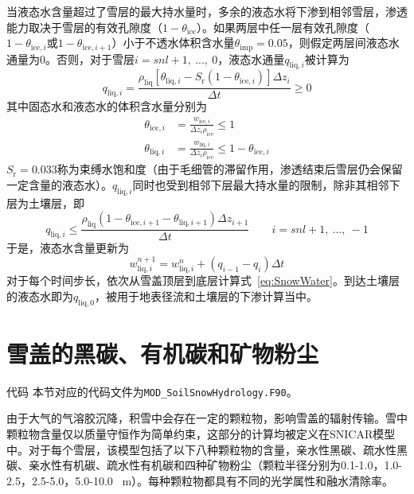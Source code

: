 当液态水含量超过了雪层的最大持水量时，多余的液态水将下渗到相邻雪层，渗透能力取决于雪层的有效孔隙度（$1-\theta_{\mathrm{ice}}$）。如果两层中任一层有效孔隙度（$1-\theta_{\mathrm{ice},i}$或$1-\theta_{\mathrm{ice},i+1}$）小于不透水体积含水量$\theta_{\mathrm{imp}}=0.05$，则假定两层间液态水通量为0。否则，对于雪层$i=snl+1,\ ...,\ 0$，液态水通量$q_{\mathrm{liq},i}$被计算为
\begin{equation}
  q_{\mathrm{liq},i}=\frac{\rho_{\mathrm{liq}}\left[\theta_{\mathrm{liq},i}-S_{\mathrm {r}} \left(1-\theta_{\mathrm{ice},i}\right)\right]\Delta z_{i} }{\Delta t}\geqslant 0
\end{equation}
其中固态水和液态水的体积含水量分别为
\begin{align}
  \theta_{\mathrm{ice},i}&=\frac{w_{\mathrm{ice},i}}{\Delta z_i \rho_{\mathrm{ice}}} \leqslant 1 \\
  \theta_{\mathrm{liq},i}&=\frac{w_{\mathrm{liq},i}}{\Delta z_i \rho_{\mathrm{ice}}} \leqslant 1-\theta_{\mathrm{ice},i}
\end{align}
$S_{\mathrm {r}} =0.033$称为束缚水饱和度（由于毛细管的滞留作用，渗透结束后雪层仍会保留一定含量的液态水）。$q_{\mathrm{liq},i}$同时也受到相邻下层最大持水量的限制，除非其相邻下层为土壤层，即
\begin{equation}
  q_{\mathrm{liq},i} \leqslant \frac{\rho_{\mathrm{liq}}\left(1-\theta_{\mathrm{ice},i+1}-\theta_{\mathrm{liq},i+1}\right)\Delta z_{i+1}}{\Delta t} \qquad i=snl+1,\ ...,\ -1
\end{equation}
于是，液态水含量更新为
\begin{equation}\label{eq:SnowWater}
  w_{\mathrm{liq},i}^{n+1}=w_{\mathrm{liq},i}^n+\left(q_{i-1}-q_i\right)\Delta t
\end{equation}
对于每个时间步长，依次从雪盖顶层到底层计算式~\eqref{eq:SnowWater}。到达土壤层的液态水即为$q_{\mathrm{liq,0}}$，被用于地表径流和土壤层的下渗计算当中。

\section{雪盖的黑碳、有机碳和矿物粉尘}
\begin{mymdframed}{代码}
  本节对应的代码文件为\texttt{MOD\_SoilSnowHydrology.F90}。
\end{mymdframed}

由于大气的气溶胶沉降，积雪中会存在一定的颗粒物，影响雪盖的辐射传输。雪中颗粒物含量仅以质量守恒作为简单约束，这部分的计算均被定义在SNICAR模型中。对于每个雪层，该模型包括了以下八种颗粒物的含量，亲水性黑碳、疏水性黑碳、亲水性有机碳、疏水性有机碳和四种矿物粉尘（颗粒半径分别为0.1-1.0，1.0-2.5，2.5-5.0，5.0-10.0 \unit{\mu m}）。每种颗粒物都具有不同的光学属性和融水清除率。

